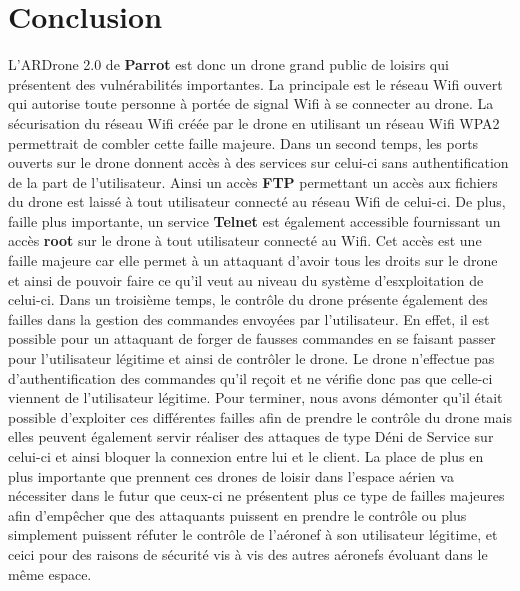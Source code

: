 \section{Conclusion}
L'ARDrone 2.0 de \textbf{Parrot} est donc un drone grand public de loisirs qui présentent des vulnérabilités importantes. La principale est le réseau Wifi ouvert qui autorise toute personne à portée de signal Wifi à se connecter au drone. La sécurisation du réseau Wifi créée par le drone en utilisant un réseau Wifi WPA2 permettrait de combler cette faille majeure. Dans un second temps, les ports ouverts sur le drone donnent accès à des services sur celui-ci sans authentification de la part de l'utilisateur. Ainsi un accès \textbf{FTP} permettant un accès aux fichiers du drone est laissé à tout utilisateur connecté au réseau Wifi de celui-ci. De plus, faille plus importante, un service \textbf{Telnet} est également accessible fournissant un accès \textbf{root} sur le drone à tout utilisateur connecté au Wifi. Cet accès est une faille majeure car elle permet à un attaquant d'avoir tous les droits sur le drone et ainsi de pouvoir faire ce qu'il veut au niveau du système d'esxploitation de celui-ci. Dans un troisième temps, le contrôle du drone présente également des failles dans la gestion des commandes envoyées par l'utilisateur. En effet, il est possible pour un attaquant de forger de fausses commandes en se faisant passer pour l'utilisateur légitime et ainsi de contrôler le drone. Le drone n'effectue pas d'authentification des commandes qu'il reçoit et ne vérifie donc pas que celle-ci viennent de l'utilisateur légitime. Pour terminer, nous avons démonter qu'il était possible d'exploiter ces différentes failles afin de prendre le contrôle du drone mais elles peuvent également servir réaliser des attaques de type Déni de Service sur celui-ci et ainsi bloquer la connexion entre lui et le client.
\newline La place de plus en plus importante que prennent ces drones de loisir dans l'espace aérien va nécessiter dans le futur que ceux-ci ne présentent plus ce type de failles majeures afin d'empêcher que des attaquants puissent en prendre le contrôle ou  plus simplement puissent réfuter le contrôle de l'aéronef à son utilisateur légitime, et ceici pour des raisons de sécurité vis à vis des autres aéronefs évoluant dans le même espace.
